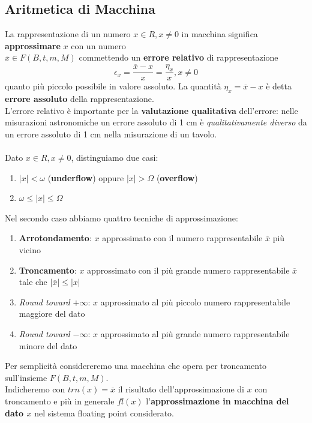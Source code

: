 \documentclass[10pt]{book}
\begin{document}
\subsection{Aritmetica di Macchina}
La rappresentazione di un numero $x \in R, x \neq 0$ in macchina significa \textbf{approssimare} $x$ con un numero\\$\overline{x} \in F(B, t, m, M)$ commettendo un \textbf{errore relativo} di rappresentazione $$\epsilon_x = \frac{\overline{x} - x}{x} = \frac{\eta_x}{x}, x \neq 0$$ quanto più piccolo possibile in valore assoluto. La quantità $\eta_x = \overline{x} - x$ è detta \textbf{errore assoluto} della rappresentazione.\\
L'errore relativo è importante per la \textbf{valutazione qualitativa} dell'errore: nelle misurazioni astronomiche un errore assoluto di 1 cm è \textit{qualitativamente diverso} da un errore assoluto di 1 cm nella misurazione di un tavolo.\\\\
Dato $x \in R, x \neq 0$, distinguiamo due casi:
\begin{enumerate}
	\item $|x| < \omega$ (\textbf{underflow}) oppure $|x| > \Omega$ (\textbf{overflow})
	\item $\omega \leq |x| \leq \Omega$
\end{enumerate}
\pagebreak
Nel secondo caso abbiamo quattro tecniche di approssimazione:
\begin{enumerate}
	\item \textbf{Arrotondamento}: $x$ approssimato con il numero rappresentabile $\overline{x}$ più vicino
	\item \textbf{Troncamento}: $x$ approssimato con il più grande numero rappresentabile $\overline{x}$ tale che $|\overline{x}| \leq |x|$
	\item \textit{Round toward $+\infty$}: $x$ approssimato al più piccolo numero rappresentabile maggiore del dato
	\item \textit{Round toward $-\infty$}: $x$ approssimato al più grande numero rappresentabile minore del dato
\end{enumerate}
Per semplicità considereremo una macchina che opera per troncamento sull'insieme $F(B, t, m, M)$.\\
Indicheremo con $trn(x) = \overline{x}$ il risultato dell'approssimazione di $x$ con troncamento e più in generale $fl(x)$ l'\textbf{approssimazione in macchina del dato $x$} nel sistema floating point considerato.
\end{document}
